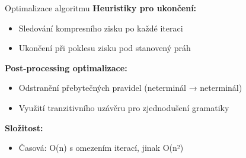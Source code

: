 \documentclass[lualatex,hyperref={pdfencoding=auto}]{beamer}
\begin{document}
\begin{frame}{Optimalizace algoritmu}
    \textbf{Heuristiky pro ukončení:}
    \begin{itemize}
        \item Sledování kompresního zisku po každé iteraci
        \item Ukončení při poklesu zisku pod stanovený práh
    \end{itemize}
    
    \vspace{10pt}
    \textbf{Post-processing optimalizace:}
    \begin{itemize}
        \item Odstranění přebytečných pravidel (neterminál → neterminál)
        \item Využití tranzitivního uzávěru pro zjednodušení gramatiky
    \end{itemize}
    
    \vspace{10pt}
    \textbf{Složitost:}
    \begin{itemize}
        \item Časová: O(n) s omezením iterací, jinak O(n²)
    \end{itemize}
\end{frame}
\end{document}
